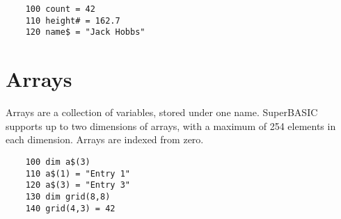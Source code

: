 \begin{verbatim}
	100 count = 42
	110 height# = 162.7
	120 name$ = "Jack Hobbs"
\end{verbatim}

\section{Arrays}

Arrays are a collection of variables, stored under one name. SuperBASIC supports up to two dimensions of arrays, with a maximum of 254 elements in each dimension. Arrays are indexed from zero.

\begin{verbatim}
	100 dim a$(3)
	110 a$(1) = "Entry 1"
	120 a$(3) = "Entry 3"
	130 dim grid(8,8)
	140 grid(4,3) = 42
\end{verbatim}
